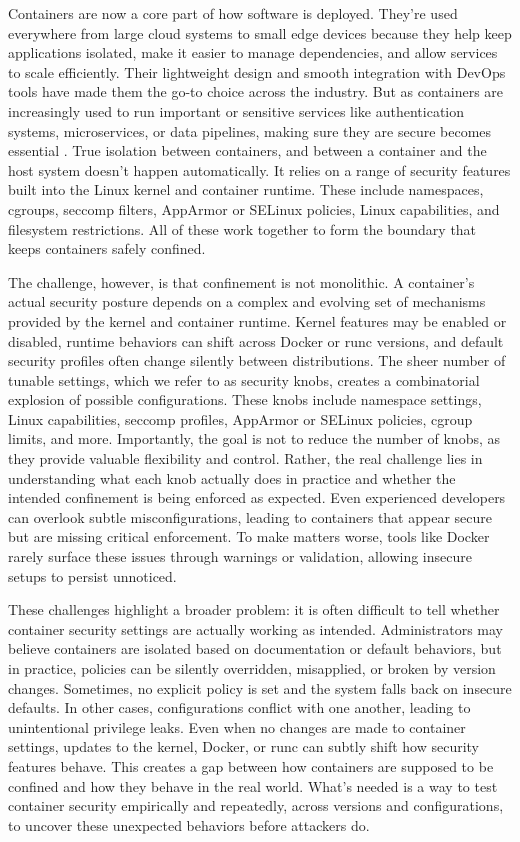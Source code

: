 \documentclass[12pt]{report}
\begin{document}
\begin{doublespace}
Containers are now a core part of how software is deployed. They’re used everywhere from large cloud systems to small edge devices because they help keep applications isolated, make it easier to manage dependencies, and allow services to scale efficiently. Their lightweight design and smooth integration with DevOps tools have made them the go-to choice across the industry. But as containers are increasingly used to run important or sensitive services like authentication systems, microservices, or data pipelines, making sure they are secure becomes essential \cite{sultan2019container}. True isolation between containers, and between a container and the host system doesn’t happen automatically. It relies on a range of security features built into the Linux kernel and container runtime. These include namespaces, cgroups, seccomp filters, AppArmor or SELinux policies, Linux capabilities, and filesystem restrictions. All of these work together to form the boundary that keeps containers safely confined.

The challenge, however, is that confinement is not monolithic. A container’s actual security posture depends on a complex and evolving set of mechanisms provided by the kernel and container runtime. Kernel features may be enabled or disabled, runtime behaviors can shift across Docker or runc versions, and default security profiles often change silently between distributions. The sheer number of tunable settings, which we refer to as security knobs, creates a combinatorial explosion of possible configurations. These knobs include namespace settings, Linux capabilities, seccomp profiles, AppArmor or SELinux policies, cgroup limits, and more. Importantly, the goal is not to reduce the number of knobs, as they provide valuable flexibility and control. Rather, the real challenge lies in understanding what each knob actually does in practice and whether the intended confinement is being enforced as expected. Even experienced developers can overlook subtle misconfigurations, leading to containers that appear secure but are missing critical enforcement. To make matters worse, tools like Docker rarely surface these issues through warnings or validation, allowing insecure setups to persist unnoticed.

These challenges highlight a broader problem: it is often difficult to tell whether container security settings are actually working as intended. Administrators may believe containers are isolated based on documentation or default behaviors, but in practice, policies can be silently overridden, misapplied, or broken by version changes. Sometimes, no explicit policy is set and the system falls back on insecure defaults. In other cases, configurations conflict with one another, leading to unintentional privilege leaks. Even when no changes are made to container settings, updates to the kernel, Docker, or runc can subtly shift how security features behave. This creates a gap between how containers are supposed to be confined and how they behave in the real world. What’s needed is a way to test container security empirically and repeatedly, across versions and configurations, to uncover these unexpected behaviors before attackers do.


\end{doublespace}
\end{document}
